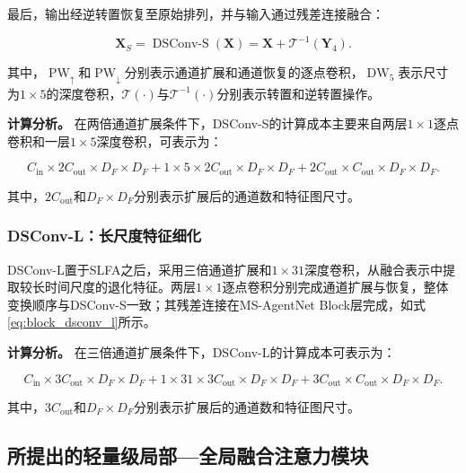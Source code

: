 最后，输出经逆转置恢复至原始排列，并与输入通过残差连接融合：

\begin{equation}
\mathbf X_S
=
\operatorname{DSConv\text{-}S}(\mathbf X)
=
\mathbf X+\mathcal T^{-1}(\mathbf Y_4).
\label{eq:dsconv_s}
\end{equation}

其中，$\operatorname{PW}_{\uparrow}$和$\operatorname{PW}_{\downarrow}$分别表示通道扩展和通道恢复的逐点卷积，$\operatorname{DW}_{5}$表示尺寸为$1\times5$的深度卷积，$\mathcal T(\cdot)$与$\mathcal T^{-1}(\cdot)$分别表示转置和逆转置操作。

\textbf{计算分析。} 在两倍通道扩展条件下，DSConv-S的计算成本主要来自两层$1\times1$逐点卷积和一层$1\times5$深度卷积，可表示为：

\begin{equation}
C_{\mathrm{in}}\times2C_{\mathrm{out}}\times D_F\times D_F
+1\times5\times2C_{\mathrm{out}}\times D_F\times D_F
+2C_{\mathrm{out}}\times C_{\mathrm{out}}\times D_F\times D_F.
\label{eq:dsconv_s_expanded_cost}
\end{equation}

其中，$2C_{\mathrm{out}}$和$D_F\times D_F$分别表示扩展后的通道数和特征图尺寸。

\subsubsection{DSConv-L：长尺度特征细化}

DSConv-L置于SLFA之后，采用三倍通道扩展和$1\times31$深度卷积，从融合表示中提取较长时间尺度的退化特征。两层$1\times1$逐点卷积分别完成通道扩展与恢复，整体变换顺序与DSConv-S一致；其残差连接在MS-AgentNet Block层完成，如式\eqref{eq:block_dsconv_l}所示。

\textbf{计算分析。} 在三倍通道扩展条件下，DSConv-L的计算成本可表示为：

\begin{equation}
C_{\mathrm{in}}\times3C_{\mathrm{out}}\times D_F\times D_F
+1\times31\times3C_{\mathrm{out}}\times D_F\times D_F
+3C_{\mathrm{out}}\times C_{\mathrm{out}}\times D_F\times D_F.
\label{eq:dsconv_l_expanded_cost}
\end{equation}

其中，$3C_{\mathrm{out}}$和$D_F\times D_F$分别表示扩展后的通道数和特征图尺寸。



\subsection{所提出的轻量级局部—全局融合注意力模块}

